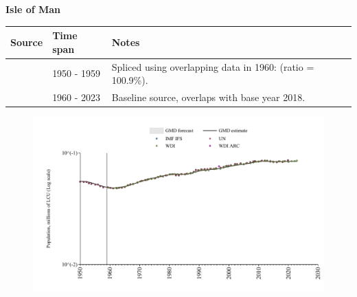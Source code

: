 \documentclass[12pt,a4paper,landscape]{article}
\begin{document}
\begin{adjustbox}{max totalsize={\paperwidth}{\paperheight},center}
\begin{minipage}[t][\textheight][t]{\textwidth}
\vspace*{0.5cm}
{}
\begin{center}
{\Large\bfseries Isle of Man}
\end{center}
\vspace{0.5cm}
\begin{table}[H]
\centering
\small
\begin{tabular}{|l|l|l|}
\hline
\textbf{Source} & \textbf{Time span} & \textbf{Notes} \\
\hline
\rowcolor{white}\cite{IMF_IFS}& 1950 - 1959 &Spliced using overlapping data in 1960: (ratio = 100.9\%).\\
\rowcolor{lightgray}\cite{WDI}& 1960 - 2023 &Baseline source, overlaps with base year 2018.\\
\hline
\end{tabular}
\end{table}
\begin{figure}[H]
\centering
\includegraphics[width=\textwidth,height=0.6\textheight,keepaspectratio]{graphs/IMN_pop.pdf}
\end{figure}
\end{minipage}
\end{adjustbox}
\end{document}
